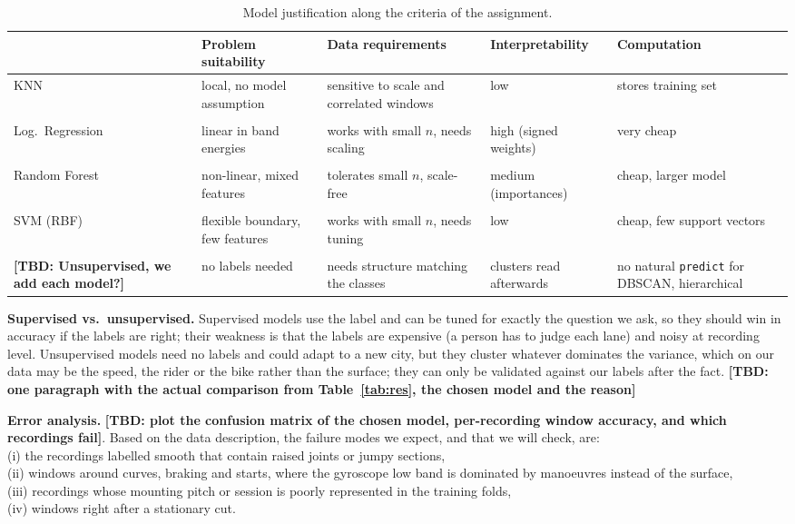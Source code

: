 \documentclass[10pt,a4paper]{article}
\newcommand{\tbd}[1]{\textbf{\textcolor{red!70!black}{[TBD: #1]}}}
\begin{document}
\begin{table}[!htbp]
\centering
\caption{Model justification along the criteria of the assignment.}
\label{tab:just}
\footnotesize
\begin{tabular}{p{2.0cm}p{3.3cm}p{3.4cm}p{3.0cm}p{3.0cm}}
\toprule
 & Problem suitability & Data requirements & Interpretability & Computation\\
\midrule
KNN & local, no model assumption & sensitive to scale and correlated windows & low & stores training set\\ \\
Log.\ Regression & linear in band energies & works with small $n$, needs scaling & high (signed weights) & very cheap\\ \\
Random Forest & non-linear, mixed features & tolerates small $n$, scale-free & medium (importances) & cheap, larger model\\ \\
SVM (RBF) & flexible boundary, few features & works with small $n$, needs tuning & low & cheap, few support vectors\\ \\
\tbd{Unsupervised, we add each model?} & no labels needed & needs structure matching the classes & clusters read afterwards & no natural \texttt{predict} for DBSCAN, hierarchical\\
\bottomrule
\end{tabular}
\end{table}

\textbf{Supervised vs.\ unsupervised.} Supervised models use the label and can be tuned for exactly the question we ask, so they should win in accuracy if the labels are right; their weakness is that the labels are expensive (a person has to judge each lane) and noisy at recording level. Unsupervised models need no labels and could adapt to a new city, but they cluster whatever dominates the variance, which on our data may be the speed, the rider or the bike rather than the surface; they can only be validated against our labels after the fact. \tbd{one paragraph with the actual comparison from Table~\ref{tab:res}, the chosen model and the reason}

\textbf{Error analysis.} \tbd{plot the confusion matrix of the chosen model, per-recording window accuracy, and which recordings fail}. Based on the data description, the failure modes we expect, and that we will check, are:\\ (i) the recordings labelled smooth that contain raised joints or jumpy sections, \\(ii) windows around curves, braking and starts, where the gyroscope low band is dominated by manoeuvres instead of the surface, \\(iii) recordings whose mounting pitch or session is poorly represented in the training folds, \\(iv) windows right after a stationary cut. 
\end{document}
